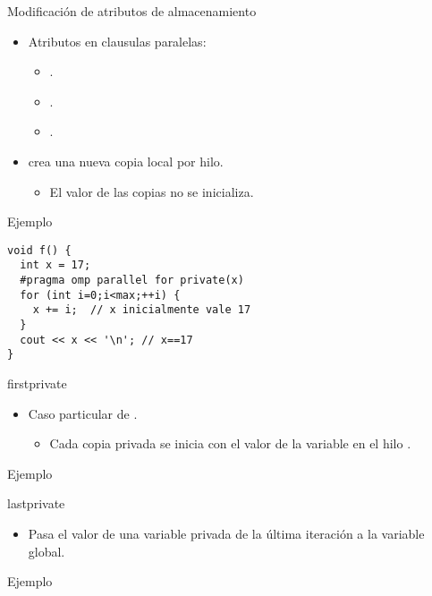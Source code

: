 \begin{frame}[t,fragile]{Modificación de atributos de almacenamiento}
\begin{itemize}
  \item Atributos en clausulas paralelas:
    \begin{itemize}
      \item {}.
      \item {}.
      \item {}.
    \end{itemize}

  \item {} crea una nueva copia local por hilo.
    \begin{itemize}
      \item El valor de las copias no se inicializa.
    \end{itemize}
\end{itemize}

\begin{block}{Ejemplo}
\begin{lstlisting}
void f() {
  int x = 17;
  #pragma omp parallel for private(x) 
  for (int i=0;i<max;++i) {
    x += i;  // x inicialmente vale 17
  }
  cout << x << '\n'; // x==17
}
\end{lstlisting}
\end{block}
\end{frame}

\begin{frame}[t,fragile]{firstprivate}
\begin{itemize}
  \item Caso particular de .
    \begin{itemize}
      \item Cada copia privada se inicia con el valor de la variable en el
            hilo .
    \end{itemize}
\end{itemize}

\begin{block}{Ejemplo}

\end{block}
\end{frame}

\begin{frame}[t,fragile]{lastprivate}
\begin{itemize}
  \item Pasa el valor de una variable privada de la última iteración  a la
        variable global.
\end{itemize}

\begin{block}{Ejemplo}

\end{block}
\end{frame}
